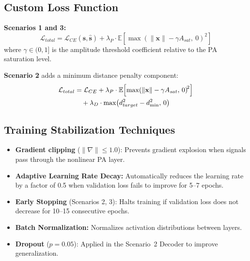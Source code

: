 \documentclass{JECnew}
\begin{document}
\subsection{Custom Loss Function}

\textbf{Scenarios 1 and 3:}
\begin{equation}
\mathcal{L}_{total} = \mathcal{L}_{CE}(\mathbf{s}, \hat{\mathbf{s}}) + \lambda_P \cdot \mathbb{E}\left[\max\left(\|\mathbf{x}\| - \gamma A_{sat},\ 0\right)^2\right]
\end{equation}
{\color{blue}where $\gamma \in (0, 1]$ is the amplitude threshold coefficient relative to the PA saturation level.}

\textbf{Scenario 2} adds a minimum distance penalty component:
\begin{equation}
{\color{blue}\begin{split}
\mathcal{L}_{total} &= \mathcal{L}_{CE} + \lambda_P \cdot \mathbb{E}\!\left[\max\!\left(\|\mathbf{x}\| - \gamma A_{sat},\, 0\right)^{\!2}\right] \\
&\quad + \lambda_D \cdot \max\!\left(d_{target}^2 - d_{\min}^2,\, 0\right)
\end{split}}
\end{equation}

\subsection{Training Stabilization Techniques}

\begin{itemize}
    \item \textbf{Gradient clipping} ($\|\nabla\| \leq 1.0$): Prevents gradient explosion when signals pass through the nonlinear PA layer.
    \item \textbf{Adaptive Learning Rate Decay:} Automatically reduces the learning rate by a factor of 0.5 when validation loss fails to improve for 5--7 epochs.
    \item \textbf{Early Stopping} (Scenarios 2, 3): Halts training if validation loss does not decrease for 10--15 consecutive epochs.
    \item \textbf{Batch Normalization:} Normalizes activation distributions between layers.
    \item \textbf{Dropout} ($p = 0.05$): Applied in the Scenario~2 Decoder to improve generalization.
\end{itemize}
\end{document}
